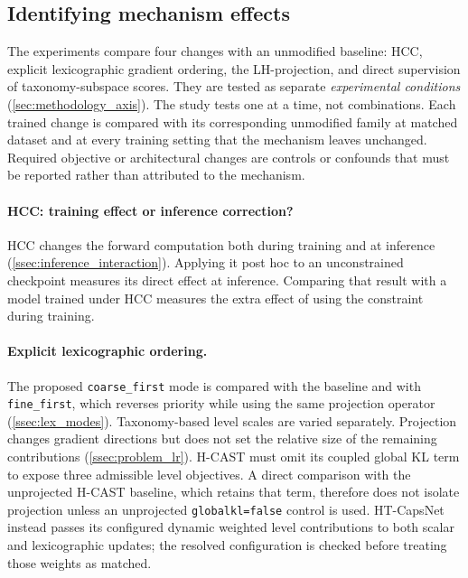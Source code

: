 \subsection{Identifying mechanism effects}
\label{ssec:design_locus}

The experiments compare four changes with an unmodified baseline: HCC,
explicit lexicographic gradient ordering, the LH-projection, and direct
supervision of taxonomy-subspace scores. They are tested as separate
\emph{experimental conditions} (\cref{sec:methodology_axis}). The study tests
one at a time, not combinations. Each trained change is compared with its
corresponding unmodified family at matched dataset and at every training setting
that the mechanism leaves unchanged. Required objective or architectural
changes are controls or confounds that must be reported rather than attributed
to the mechanism.

\paragraph{HCC: training effect or inference correction?} HCC changes the
forward computation both during training and at inference
(\cref{ssec:inference_interaction}). Applying it post hoc to an unconstrained
checkpoint measures its direct effect at inference. Comparing that result with a model
trained under HCC measures the extra effect of using the constraint during
training.

\paragraph{Explicit lexicographic ordering.} The proposed
\texttt{coarse\_first} mode is compared with the baseline and with
\texttt{fine\_first}, which reverses priority while using the same projection
operator (\cref{ssec:lex_modes}). Taxonomy-based level scales are varied
separately. Projection changes gradient directions but does not set the relative
size of the remaining contributions (\cref{ssec:problem_lr}). H-CAST must omit
its coupled global KL term to expose three admissible level objectives. A direct
comparison with the unprojected H-CAST baseline, which retains that term,
therefore does not isolate projection unless an unprojected
\texttt{globalkl=false} control is used. HT-CapsNet instead passes its configured
dynamic weighted level contributions to both scalar and lexicographic updates;
the resolved configuration is checked before treating those weights as matched.

